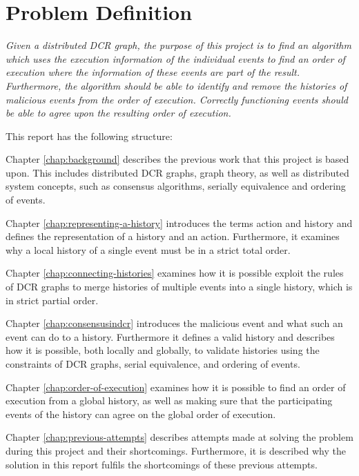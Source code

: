 \section{Problem Definition}
	\textit{Given a distributed DCR graph, the purpose of this project is to find an algorithm which uses the execution information of the individual events to find an order of execution where the information of these events are part of the result. Furthermore, the algorithm should be able to identify and remove the histories of malicious events from the order of execution. Correctly functioning events should be able to agree upon the resulting order of execution.}
	
	\vspace{0.4cm}
	
	\newpar
	This report has the following structure:
	
	\newpar
	Chapter \ref{chap:background} describes the previous work that this project is based upon. This includes distributed DCR graphs, graph theory, as well as distributed system concepts, such as consensus algorithms, serially equivalence and ordering of events.
		
	\newpar
	Chapter \ref{chap:representing-a-history} introduces the terms action and history and defines the representation of a history and an action.
	Furthermore, it examines why a local history of a single event must be in a strict total order.
		
	\newpar
	Chapter \ref{chap:connecting-histories} examines how it is possible exploit the rules of DCR graphs to merge histories of multiple events into a single history, which is in strict partial order.
	
	\newpar
	Chapter \ref{chap:consensusindcr} introduces the malicious event and what such an event can do to a history. Furthermore it defines a valid history and describes how it is possible, both locally and globally, to validate histories using the constraints of DCR graphs, serial equivalence, and ordering of events.
	
    \newpar
    Chapter \ref{chap:order-of-execution} examines how it is possible to find an order of execution from a global history, as well as making sure that the participating events of the history can agree on the global order of execution.
    
	\newpar
	Chapter \ref{chap:previous-attempts} describes attempts made at solving the problem during this project and their shortcomings. Furthermore, it is described why the solution in this report fulfils the shortcomings of these previous attempts. 
		
	